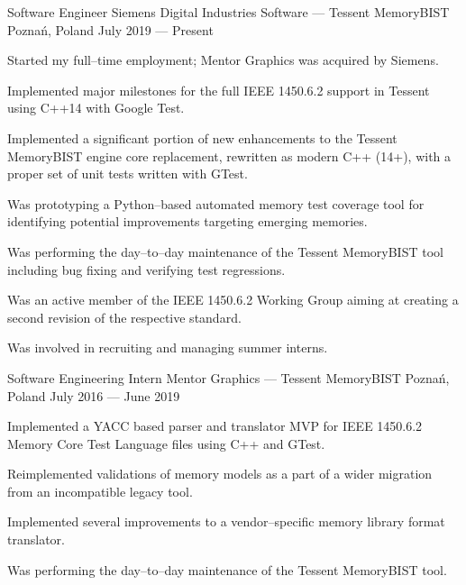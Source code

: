\documentclass[11pt, a4paper]{awesome-cv}
\begin{document}
\begin{cventries}
  \cventry
    {Software Engineer} %
    {Siemens Digital Industries Software --- Tessent MemoryBIST} %
    {Poznań, Poland} %
    {July 2019 --- Present} %
    {
      \begin{cvitems} %
      \item {Started my full--time employment; Mentor Graphics was acquired by Siemens.}
      \item {Implemented major milestones for the full IEEE 1450.6.2 support in Tessent using C++14 with Google Test.}
      \item {Implemented a significant portion of new enhancements to the Tessent MemoryBIST engine core replacement, rewritten as modern C++ (14+), with a proper set of unit tests written with GTest.}
      \item {Was prototyping a Python--based automated memory test coverage tool for identifying potential improvements targeting emerging memories.}
      \item {Was performing the day--to--day maintenance of the Tessent MemoryBIST tool including bug fixing and verifying test regressions.}
      \item {Was an active member of the IEEE 1450.6.2 Working Group aiming at creating a second revision of the respective standard.}
      \item {Was involved in recruiting and managing summer interns.}
      \end{cvitems}
    }

  \cventry
    {Software Engineering Intern} %
    {Mentor Graphics --- Tessent MemoryBIST} %
    {Poznań, Poland} %
    {July 2016 --- June 2019} %
    {
      \begin{cvitems} %
      \item {Implemented a YACC based parser and translator MVP for IEEE 1450.6.2 Memory Core Test Language files using C++ and GTest.}
      \item {Reimplemented validations of memory models as a part of a wider migration from an incompatible legacy tool.}
      \item {Implemented several improvements to a vendor--specific memory library format translator.}
      \item {Was performing the day--to--day maintenance of the Tessent MemoryBIST tool.}
      \end{cvitems}
    }


\end{cventries}
\end{document}
